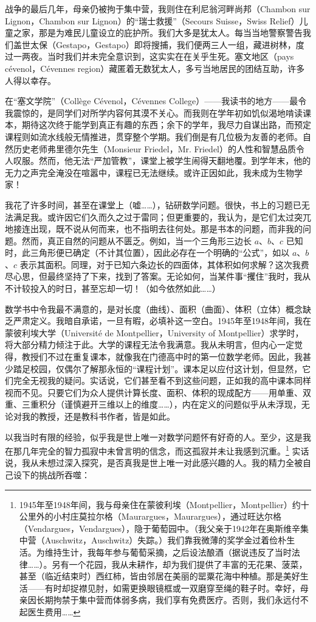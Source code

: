 战争的最后几年，母亲仍被拘于集中营，我则住在利尼翁河畔尚邦（Chambon sur Lignon，Chambon sur Lignon）的“瑞士救援”（Secours Suisse，Swiss Relief）儿童之家，那是为难民儿童设立的庇护所。我们大多是犹太人。每当当地警察警告我们盖世太保（Gestapo，Gestapo）即将搜捕，我们便两三人一组，藏进树林，度过一两夜。当时我们并未完全意识到，这实实在在关乎生死。塞文地区（pays cévenol，Cévennes region）藏匿着无数犹太人，多亏当地居民的团结互助，许多人得以幸存。

在“塞文学院”（Collège Cévenol，Cévennes College）——我读书的地方——最令我震惊的，是同学们对所学内容何其漠不关心。而我则在学年初如饥似渴地啃读课本，期待这次终于能学到真正有趣的东西；余下的学年，我尽力自谋出路，而预定课程则如流水线般无情推进，贯穿整个学期。我们倒是有几位极为友善的老师。自然历史老师弗里德尔先生（Monsieur Friedel，Mr. Friedel）的人性和智慧品质令人叹服。然而，他无法“严加管教”，课堂上被学生闹得天翻地覆。到学年末，他的无力之声完全淹没在喧嚣中，课程已无法继续。或许正因如此，我未成为生物学家！

我花了许多时间，甚至在课堂上（嘘……），钻研数学问题。很快，书上的习题已无法满足我。或许因它们久而久之过于雷同；但更重要的，我认为，是它们太过突兀地接连出现，既不说从何而来，也不指明去往何处。那是书本的问题，而非我的问题。然而，真正自然的问题从不匮乏。例如，当一个三角形三边长 \( a \)、\( b \)、\( c \) 已知时，此三角形便已确定（不计其位置），因此必存在一个明确的“公式”，如以 \( a \)、\( b \)、\( c \) 表示其面积。同理，对于已知六条边长的四面体，其体积如何求解？这次我费尽心思，但最终坚持了下来，找到了答案。无论如何，当某件事“攫住”我时，我从不计较投入的时日，甚至忘却一切！（如今依然如此……）

数学书中令我最不满意的，是对长度（曲线）、面积（曲面）、体积（立体）概念缺乏严肃定义。我暗自承诺，一旦有暇，必填补这一空白。1945年至1948年间，我在蒙彼利埃大学（Université de Montpellier，University of Montpellier）求学时，将大部分精力倾注于此。大学的课程无法令我满意。我从未明言，但内心一定觉得，教授们不过在重复课本，就像我在门德高中时的第一位数学老师。因此，我甚少踏足校园，仅偶尔了解那永恒的“课程计划”。课本足以应付这计划，但显然，它们完全无视我的疑问。实话说，它们甚至看不到这些问题，正如我的高中课本同样视而不见。只要它们为众人提供计算长度、面积、体积的现成配方——用单重、双重、三重积分（谨慎避开三维以上的维度……），内在定义的问题似乎从未浮现，无论对我的教授，还是教科书作者，皆是如此。

以我当时有限的经验，似乎我是世上唯一对数学问题怀有好奇的人。至少，这是我在那几年完全的智力孤寂中未曾言明的信念，而这孤寂并未让我感到沉重。\footnote{1945年至1948年间，我与母亲住在蒙彼利埃（Montpellier，Montpellier）约十公里外的小村庄莫拉尔格（Maurargues，Maurargues），通过旺达尔格（Vendargues，Vendargues），隐于葡萄园中。（我父亲于1942年在奥斯维辛集中营（Auschwitz，Auschwitz）失踪。）我们靠我微薄的奖学金过着俭朴生活。为维持生计，我每年参与葡萄采摘，之后设法酿酒（据说违反了当时法律……）。另有一个花园，我从未耕作，却为我们提供了丰富的无花果、菠菜，甚至（临近结束时）西红柿，皆由邻居在美丽的罂粟花海中种植。那是美好生活——有时却捉襟见肘，如需更换眼镜框或一双磨穿至绳的鞋子时。幸好，母亲因长期拘禁于集中营而体弱多病，我们享有免费医疗。否则，我们永远付不起医生费用……} 实话说，我从未想过深入探究，是否真我是世上唯一对此感兴趣的人。我的精力全被自己设下的挑战所吞噬：

